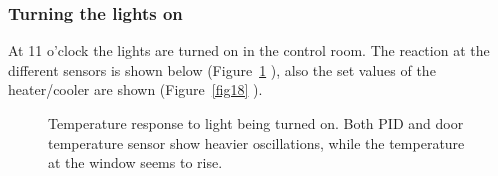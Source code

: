 \documentclass[12pt]{scrartcl}
\begin{document}
      \subsubsection{Turning the lights on}
      At 11 o'clock the lights are turned on in the control room. The reaction at
      the different sensors is shown below (Figure~\ref{fig17} ), also the set
      values of the heater/cooler are shown (Figure~\ref{fig18} ).
      \begin{figure}[h!]
        \hspace{-40pt}
        \hspace{-20pt}
        \caption{Temperature response to light being turned on. Both PID and door
        temperature sensor show heavier oscillations, while the temperature at the
        window seems to rise.}
        \label{fig17}
      \end{figure} \\
\end{document}
